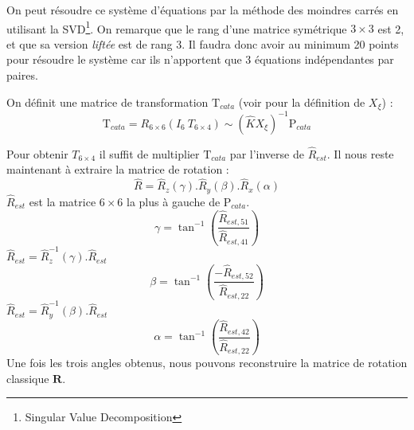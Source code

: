 On peut résoudre ce système d'équations par la méthode des moindres carrés en utilisant la SVD\footnote{Singular Value Decomposition}.
On remarque que le rang d'une matrice symétrique $3\times3$ est 2, et que sa version \emph{liftée} est de rang 3.
Il faudra donc avoir au minimum 20 points pour résoudre le système car ils n'apportent que 3 équations indépendantes par paires.


On définit une matrice de transformation $\text{T}_{cata}$ (voir \cite{Puig11PhD} pour la définition de $X_\xi$) :
\begin{equation}
\text{T}_{cata} = R_{6\times6} \left(I_6~T_{6\times4} \right) \sim (\hat{K}X_\xi )^{-1} \text{P}_{cata}
\end{equation}

Pour obtenir $T_{6\times4}$ il suffit de multiplier $\text{T}_{cata}$ par l'inverse de $\hat{R}_{est}$.
Il nous reste maintenant à extraire la matrice de rotation :
\begin{equation}
\hat{R} = \hat{R}_z(\gamma).\hat{R}_y(\beta).\hat{R}_x(\alpha)
\end{equation}
$\hat{R}_{est}$ est la matrice $6\times6$ la plus à gauche de $\text{P}_{cata}$.
\begin{equation}
\gamma = \tan^{-1}\left(\frac{\hat{R}_{est,51}}{\hat{R}_{est,41}}\right)
\end{equation}
$\hat{R}_{est} = \hat{R}_z^{-1}(\gamma).\hat{R}_{est}$
\begin{equation}
\beta = \tan^{-1}\left(\frac{-\hat{R}_{est,52}}{\hat{R}_{est,22}}\right)
\end{equation}
$\hat{R}_{est} = \hat{R}_y^{-1}(\beta).\hat{R}_{est}$
\begin{equation}
\alpha = \tan^{-1}\left(\frac{\hat{R}_{est,42}}{\hat{R}_{est,22}}\right)
\end{equation}
Une fois les trois angles obtenus, nous pouvons reconstruire la matrice de rotation classique $\mathbf{R}$.

